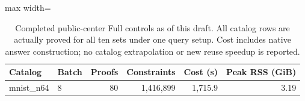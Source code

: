 \begin{table}[tp]
\caption{Completed public-center Full controls as of this draft. All catalog rows are actually proved for all ten sets under one query setup. Cost includes native answer construction; no catalog extrapolation or new reuse speedup is reported.}\label{tab:public-full-complete}
\centering\small
\begin{adjustbox}{max width=\textwidth}
\begin{tabular}{@{}llrrrr@{}}
\toprule
Catalog & Batch & Proofs & Constraints & Cost (s) & Peak RSS (GiB) \\
\midrule
mnist\_n64 & 8 & 80 & 1,416,899 & 1,715.9 & 3.19 \\
\bottomrule
\end{tabular}
\end{adjustbox}
\end{table}
